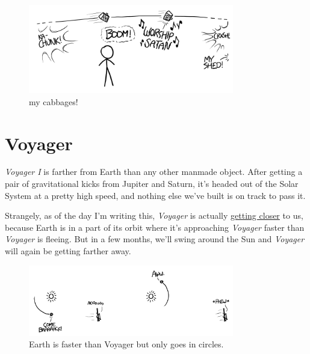 \begin{figure}[!htbp]
\centering
\includegraphics[scale=0.5, max width=0.8\textwidth]{imgs/a/37/stereo_message.png}
\caption{my cabbages!}
\end{figure}

{
\chapter{Voyager}
}

\hfill{}

{ \emph{Voyager I} is farther from Earth than any other manmade object. After getting a pair of gravitational kicks from Jupiter and Saturn, it’s headed out of the Solar System at a pretty high speed, and nothing else we’ve built is on track to pass it.}

{Strangely, as of the day I’m writing this, \emph{Voyager} is actually \href{http://voyager.jpl.nasa.gov/where/}{getting closer} to us, because Earth is in a part of its orbit where it’s approaching \emph{Voyager} faster than \emph{Voyager} is fleeing. But in a few months, we’ll swing around the Sun and \emph{Voyager} will again be getting farther away.}

\begin{figure}[!htbp]
\centering
\includegraphics[scale=0.5, max width=0.8\textwidth]{imgs/a/38/voyager_earth.png}
\caption{Earth is faster than Voyager but only goes in circles.}
\end{figure}

